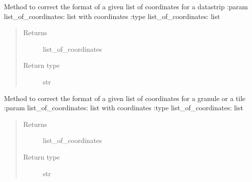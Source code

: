 
\begin{fulllineitems}
\label{\detokenize{s2boa.ingestions:s2boa.ingestions.functions.correct_footprint}}
\end{fulllineitems}


\begin{fulllineitems}
\label{\detokenize{s2boa.ingestions:s2boa.ingestions.functions.correct_list_of_coordinates_for_ds}}
Method to correct the format of a given list of coordinates for a datastrip
:param list\_of\_coordinates: list with coordinates
:type list\_of\_coordinates: list
\begin{quote}\begin{description}
\item[{Returns}] \leavevmode
list\_of\_coordinates

\item[{Return type}] \leavevmode
str

\end{description}\end{quote}

\end{fulllineitems}


\begin{fulllineitems}
\label{\detokenize{s2boa.ingestions:s2boa.ingestions.functions.correct_list_of_coordinates_for_gr_tl}}
Method to correct the format of a given list of coordinates for a granule or a tile
:param list\_of\_coordinates: list with coordinates
:type list\_of\_coordinates: list
\begin{quote}\begin{description}
\item[{Returns}] \leavevmode
list\_of\_coordinates

\item[{Return type}] \leavevmode
str

\end{description}\end{quote}

\end{fulllineitems}

